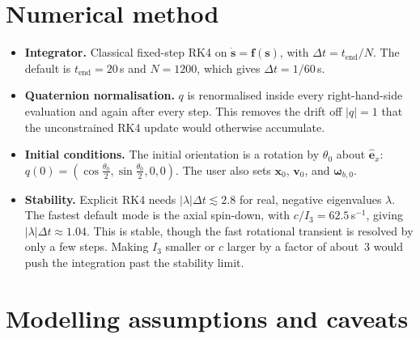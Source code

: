 \documentclass[11pt]{article}
\newcommand{\vect}[1]{\bm{#1}}
\theoremstyle{remark}
\begin{document}
\section{Numerical method}

\begin{itemize}
  \item \textbf{Integrator.} Classical fixed-step RK4 on
        $\dot{\vect{s}}=\vect{f}(\vect{s})$, with
        $\Delta t = t_{\text{end}}/N$. The default is
        $t_{\text{end}}=20$\,s and $N=1200$, which gives $\Delta t=1/60$\,s.
  \item \textbf{Quaternion normalisation.} $q$ is renormalised inside every
        right-hand-side evaluation and again after every step. This removes
        the drift off $|q|=1$ that the unconstrained RK4 update would
        otherwise accumulate.
  \item \textbf{Initial conditions.} The initial orientation is a rotation
        by $\theta_0$ about $\hat{\vect{e}}_x$:
        $q(0)=(\cos\tfrac{\theta_0}{2},\sin\tfrac{\theta_0}{2},0,0)$.
        The user also sets $\vect{x}_0$, $\vect{v}_0$, and $\vect{\omega}_{b,0}$.
  \item \textbf{Stability.} Explicit RK4 needs $|\lambda|\Delta t\lesssim2.8$
        for real, negative eigenvalues $\lambda$. The fastest default mode
        is the axial spin-down, with $c/I_3=62.5$\,s$^{-1}$, giving
        $|\lambda|\Delta t\approx1.04$. This is stable, though the fast
        rotational transient is resolved by only a few steps. Making
        $I_3$ smaller or $c$ larger by a factor of about~3 would push the
        integration past the stability limit.
\end{itemize}

\section{Modelling assumptions and caveats}
\label{sec:caveats}
\end{document}
